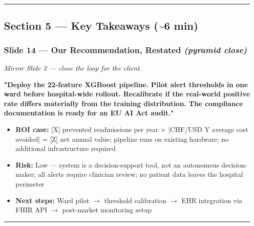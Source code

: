 \documentclass[11pt,a4paper]{article}
\begin{document}
\noindent\rule{\linewidth}{0.4pt}

\subsection{Section 5 --- Key Takeaways (\textasciitilde{}6 min)}

\subsubsection{Slide 14 --- Our Recommendation, Restated \emph{(pyramid close)}}
\emph{Mirror Slide 2 --- close the loop for the client.}

\begin{mdframed}[style=recbox]
\textbf{"Deploy the 22-feature XGBoost pipeline. Pilot alert thresholds in one ward before hospital-wide rollout. Recalibrate if the real-world positive rate differs materially from the training distribution. The compliance documentation is ready for an EU AI Act audit."}
\end{mdframed}

\begin{itemize}
\item \textbf{ROI case:} [X] prevented readmissions per year $\times$ [CHF/USD Y average cost avoided] = [Z] net annual value; pipeline runs on existing hardware; no additional infrastructure required
\item \textbf{Risk:} Low --- system is a decision-support tool, not an autonomous decision-maker; all alerts require clinician review; no patient data leaves the hospital perimeter
\item \textbf{Next steps:} Ward pilot $\rightarrow$ threshold calibration $\rightarrow$ EHR integration via FHIR API $\rightarrow$ post-market monitoring setup
\end{itemize}

\noindent\rule{\linewidth}{0.4pt}
\end{document}
